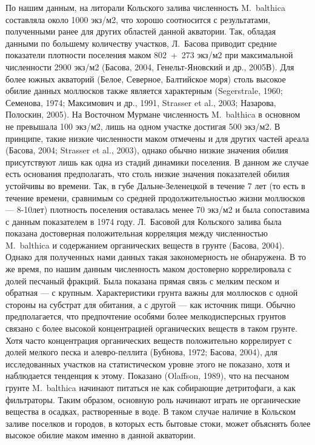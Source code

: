 По нашим данным, на литорали Кольского залива численность M. balthica составляла около 1000 экз/м2, что хорошо соотносится с результатами, полученными ранее для других областей данной акватории. Так, обладая данными по большему количеству участков, Л. Басова приводит средние показатели плотности поселения маком 802 + 273 экз/м2 при максимальной численности 2900 экз/м2 (Басова, 2004, Генельт-Яновский и др., 2005В). Для более южных акваторий (Белое, Северное, Балтийское моря) столь высокое обилие данных моллюсков также является характерным (Segerstrale, 1960; Семенова, 1974; Максимович и др., 1991, Strasser et al., 2003; Назарова, Полоскин, 2005). На Восточном Мурмане численность M. balthica в основном не превышала 100 экз/м2, лишь на одном участке достигая 500 экз/м2. В принципе, такие низкие численности маком отмечены и для других частей ареала (Басова, 2004; Strasser et al., 2003), однако обычно низкие значения обилия присутствуют лишь как одна из стадий динамики поселения. В данном же случае есть основания предполагать, что столь низкие значения показателей обилия устойчивы во времени. Так, в губе Дальне-Зеленецкой в течение 7 лет (то есть в течение времени, сравнимым со средней продолжительностью жизни моллюсков — 8-10лет) плотность поселения	оставалась менее 70 экз/м2 и была сопоставима с данным показателем в 1974 году. 
	Л. Басовой для Кольского залива была показана достоверная положительная корреляция между численностью M. balthica и содержанием органических веществ в грунте (Басова, 2004).   Однако для полученных нами данных такая закономерность не обнаружена. В то же время, по нашим данным численность маком достоверно коррелировала с долей песчаный фракций. Была показана прямая связь с мелким песком и обратная — с крупным. Характеристики грунта важны для моллюсков с одной стороны на субстрат для обитания, а с другой — как источник пищи. Обычно предполагается, что предпочтение особями более мелкодисперсных грунтов связано с более высокой концентрацией органических веществ в таком грунте. Хотя часто концентрация органических веществ положительно коррелирует с долей мелкого песка и алевро-пеллита (Бубнова, 1972; Басова, 2004), для исследованных участков на статистическом уровне этого не показано, хотя и наблюдается тенденция к этому. 	Показано (Olaffson, 1989), что на песчаном грунте M. balthica начинают питаться не как собирающие детритофаги, а как фильтраторы. Таким образом, основную роль начинают играть не органические вещества в осадках, растворенные в воде. В таком случае наличие в Кольском заливе поселков и городов, в которых есть бытовые стоки, может объяснять более высокое обилие маком именно в данной акватории.



